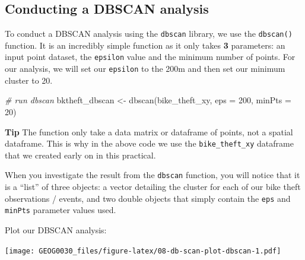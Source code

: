 \documentclass[
]{book}
\newenvironment{Shaded}{\begin{snugshade}}{\end{snugshade}}
\newcommand{\AttributeTok}[1]{\textcolor[rgb]{0.77,0.63,0.00}{#1}}
\newcommand{\CommentTok}[1]{\textcolor[rgb]{0.56,0.35,0.01}{\textit{#1}}}
\newcommand{\DecValTok}[1]{\textcolor[rgb]{0.00,0.00,0.81}{#1}}
\newcommand{\FunctionTok}[1]{\textcolor[rgb]{0.00,0.00,0.00}{#1}}
\newcommand{\NormalTok}[1]{#1}
\newcommand{\OtherTok}[1]{\textcolor[rgb]{0.56,0.35,0.01}{#1}}
\newcommand{\SpecialCharTok}[1]{\textcolor[rgb]{0.00,0.00,0.00}{#1}}
\begin{document}
\hypertarget{conducting-a-dbscan-analysis}{%
\subsection{Conducting a DBSCAN analysis}\label{conducting-a-dbscan-analysis}}

To conduct a DBSCAN analysis using the \texttt{dbscan} library, we use the \texttt{dbscan()} function. It is an incredibly simple function as it only takes \textbf{3} parameters: an input point dataset, the \texttt{epsilon} value and the minimum number of points. For our analysis, we will set our \texttt{epsilon} to the 200m and then set our minimum cluster to 20.

\begin{Shaded}
\begin{Highlighting}[]
\CommentTok{\# run dbscan}
\NormalTok{bktheft\_dbscan }\OtherTok{\textless{}{-}} \FunctionTok{dbscan}\NormalTok{(bike\_theft\_xy, }\AttributeTok{eps =} \DecValTok{200}\NormalTok{, }\AttributeTok{minPts =} \DecValTok{20}\NormalTok{)}
\end{Highlighting}
\end{Shaded}

\textbf{Tip}
The function only take a data matrix or dataframe of points, not a spatial dataframe. This is why in the above code we use the \texttt{bike\_theft\_xy} dataframe that we created early on in this practical.

When you investigate the result from the \texttt{dbscan} function, you will notice that it is a ``list'' of three objects: a vector detailing the cluster for each of our bike theft observations / events, and two double objects that simply contain the \texttt{eps} and \texttt{minPts} parameter values used.

Plot our DBSCAN analysis:

\begin{Shaded}
\end{Shaded}

\texttt{[image: GEOG0030\_files/figure-latex/08-db-scan-plot-dbscan-1.pdf]}
\end{document}
